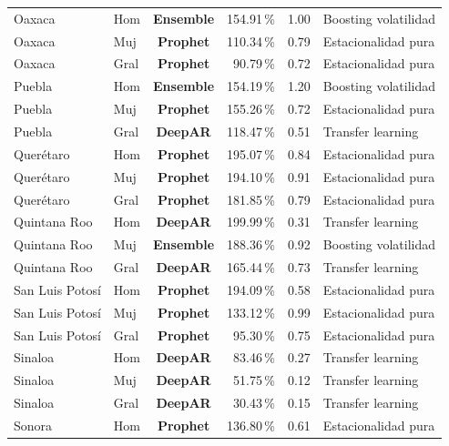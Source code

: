 \documentclass[12pt, letterpaper]{article}
\begin{document}
\begin{longtable}{l l >{\bfseries}c r r l}
Oaxaca & Hom & \textcolor{censemble}{\textbf{Ensemble}} & 154.91\,\% & 1.00 & Boosting volatilidad \\
Oaxaca & Muj & \textcolor{cprophet}{\textbf{Prophet}} & 110.34\,\% & 0.79 & Estacionalidad pura \\
Oaxaca & Gral & \textcolor{cprophet}{\textbf{Prophet}} & 90.79\,\% & 0.72 & Estacionalidad pura \\
Puebla & Hom & \textcolor{censemble}{\textbf{Ensemble}} & 154.19\,\% & 1.20 & Boosting volatilidad \\
Puebla & Muj & \textcolor{cprophet}{\textbf{Prophet}} & 155.26\,\% & 0.72 & Estacionalidad pura \\
Puebla & Gral & \textcolor{cdeepar}{\textbf{DeepAR}} & 118.47\,\% & 0.51 & Transfer learning \\
Querétaro & Hom & \textcolor{cprophet}{\textbf{Prophet}} & 195.07\,\% & 0.84 & Estacionalidad pura \\
Querétaro & Muj & \textcolor{cprophet}{\textbf{Prophet}} & 194.10\,\% & 0.91 & Estacionalidad pura \\
Querétaro & Gral & \textcolor{cprophet}{\textbf{Prophet}} & 181.85\,\% & 0.79 & Estacionalidad pura \\
Quintana Roo & Hom & \textcolor{cdeepar}{\textbf{DeepAR}} & 199.99\,\% & 0.31 & Transfer learning \\
Quintana Roo & Muj & \textcolor{censemble}{\textbf{Ensemble}} & 188.36\,\% & 0.92 & Boosting volatilidad \\
Quintana Roo & Gral & \textcolor{cdeepar}{\textbf{DeepAR}} & 165.44\,\% & 0.73 & Transfer learning \\
San Luis Potosí & Hom & \textcolor{cprophet}{\textbf{Prophet}} & 194.09\,\% & 0.58 & Estacionalidad pura \\
San Luis Potosí & Muj & \textcolor{cprophet}{\textbf{Prophet}} & 133.12\,\% & 0.99 & Estacionalidad pura \\
San Luis Potosí & Gral & \textcolor{cprophet}{\textbf{Prophet}} & 95.30\,\% & 0.75 & Estacionalidad pura \\
Sinaloa & Hom & \textcolor{cdeepar}{\textbf{DeepAR}} & 83.46\,\% & 0.27 & Transfer learning \\
Sinaloa & Muj & \textcolor{cdeepar}{\textbf{DeepAR}} & 51.75\,\% & 0.12 & Transfer learning \\
Sinaloa & Gral & \textcolor{cdeepar}{\textbf{DeepAR}} & 30.43\,\% & 0.15 & Transfer learning \\
Sonora & Hom & \textcolor{cprophet}{\textbf{Prophet}} & 136.80\,\% & 0.61 & Estacionalidad pura \\

\end{longtable}
\end{document}

